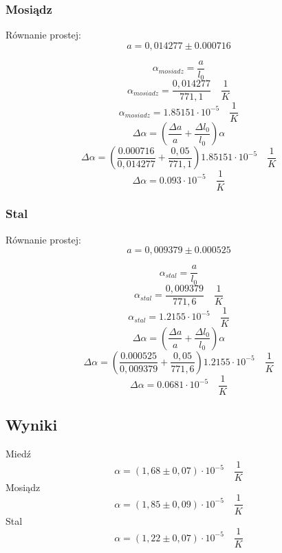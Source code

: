 \documentclass[a4paper, 11pt]{article}
\begin{document}
\subsubsection{Mosiądz}\label{sub:mosiadz} %
Równanie prostej:
\[
	a = 0,014277 \pm 0.000716
\]
\begin{multicols}{2}
	\[
		\alpha_{mosiadz} = \frac{a}{l_0}
	\]
	\[
		\alpha_{mosiadz} = \frac{0,014277}{771,1} \quad \frac{1}{K}
	\]
	\[
		\alpha_{mosiadz} = 1.85151 \cdot 10^{-5} \quad \frac{1}{K}
	\]
	\columnbreak
	\[
		\Delta \alpha = \left( \frac{\Delta a}{a} + \frac{\Delta l_0}{l_0} \right) \alpha
	\]
	\[
		\Delta \alpha = \left( \frac{0.000716}{0,014277} + \frac{0,05}{771,1} \right) 1.85151 \cdot 10^{-5}\quad \frac{1}{K}
	\]
	\[
		\Delta \alpha = 0.093 \cdot 10^{-5}\quad \frac{1}{K}
	\]
\end{multicols}

\subsubsection{Stal}\label{sub:stal} %
Równanie prostej:
\[
	a = 0,009379 \pm  0.000525
\]
\begin{multicols}{2}
	\[
		\alpha_{stal} = \frac{a}{l_0}
	\]
	\[
		\alpha_{stal} = \frac{0,009379}{771,6} \quad \frac{1}{K}
	\]
	\[
		\alpha_{stal} = 1.2155 \cdot 10^{-5} \quad \frac{1}{K}
	\]
	\columnbreak
	\[
		\Delta \alpha = \left( \frac{\Delta a}{a} + \frac{\Delta l_0}{l_0} \right) \alpha
	\]
	\[
		\Delta \alpha = \left( \frac{0.000525}{0,009379} + \frac{0,05}{771,6} \right) 1.2155 \cdot 10^{-5}\quad \frac{1}{K}
	\]
	\[
		\Delta \alpha = 0.0681 \cdot 10^{-5}\quad \frac{1}{K}
	\]
\end{multicols}

\pagebreak
\subsection{Wyniki}\label{sub:wyniki} %

\begin{center}
	\Large
	Miedź
	\[
		\alpha = (1,68 \pm 0,07)  \cdot 10^{-5} \quad \frac{1}{K}
	\]
	Mosiądz
	\[
		\alpha = (1,85 \pm 0,09)  \cdot 10^{-5} \quad \frac{1}{K}
	\]
	Stal
	\[
		\alpha = (1,22 \pm 0,07) \cdot 10^{-5} \quad \frac{1}{K}
	\]
\end{center}

\end{document}
